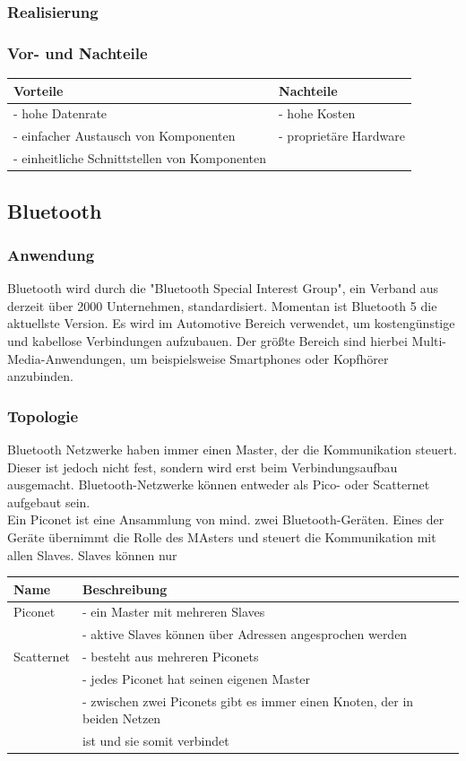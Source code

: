 \subsubsection{Realisierung}
\subsubsection{Vor- und Nachteile}
\begin{tabular}{l |l}
Vorteile & Nachteile\\
\hline - hohe Datenrate & - hohe Kosten\\
\hline - einfacher Austausch von Komponenten & - proprietäre Hardware\\
\hline - einheitliche Schnittstellen von Komponenten &\\
\end{tabular}

\subsection{Bluetooth}		
\subsubsection{Anwendung}
Bluetooth wird durch die "Bluetooth Special Interest Group", ein Verband aus derzeit über 2000 Unternehmen,  standardisiert. Momentan ist Bluetooth 5 die aktuellste Version. Es wird im Automotive Bereich verwendet, um kostengünstige und kabellose Verbindungen aufzubauen. Der größte Bereich sind hierbei Multi-Media-Anwendungen, um beispielsweise Smartphones oder Kopfhörer anzubinden.
\subsubsection{Topologie}
Bluetooth Netzwerke haben immer einen Master, der die Kommunikation steuert. Dieser ist jedoch nicht fest, sondern wird erst beim Verbindungsaufbau ausgemacht.
Bluetooth-Netzwerke können entweder als Pico- oder Scatternet aufgebaut sein.
\\
Ein Piconet ist eine Ansammlung von mind. zwei Bluetooth-Geräten. Eines der Geräte übernimmt die Rolle des MAsters und steuert die Kommunikation mit allen Slaves. Slaves können nur 
\begin{tabular}{l|l}
	Name & Beschreibung\\
	\hline Piconet & - ein Master mit mehreren Slaves\\
	& - aktive Slaves können über Adressen angesprochen werden\\
	\hline Scatternet & - besteht aus mehreren Piconets\\
	& - jedes Piconet hat seinen eigenen Master\\
	& - zwischen zwei Piconets gibt es immer einen Knoten, der in beiden Netzen \\
	& ist und sie somit verbindet\\
\end{tabular}

